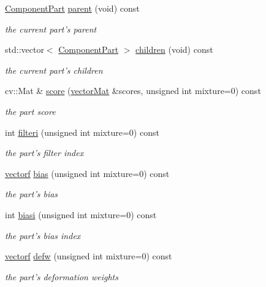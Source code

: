 \begin{DoxyCompactItemize}
\hyperlink{classComponentPart}{Component\-Part} \hyperlink{classComponentPart_a563956730a05cb34cc41278b6df1fa81}{parent} (void) const 
\begin{DoxyCompactList}\small\item\em the current part's parent \end{DoxyCompactList}\item 
std\-::vector$<$ \hyperlink{classComponentPart}{Component\-Part} $>$ \hyperlink{classComponentPart_acfa581b85329b7bf7eb4d10c2552db57}{children} (void) const 
\begin{DoxyCompactList}\small\item\em the current part's children \end{DoxyCompactList}\item 
cv\-::\-Mat \& \hyperlink{classComponentPart_a91d932065c3d5966282454c3ccde1171}{score} (\hyperlink{types_8hpp_a3207a7addcfa415d1c83622febcb1e9b}{vector\-Mat} \&scores, unsigned int mixture=0) const 
\begin{DoxyCompactList}\small\item\em the part score \end{DoxyCompactList}\item 
int \hyperlink{classComponentPart_a1a64f4ea97a74e67976c6132fa5b6709}{filteri} (unsigned int mixture=0) const 
\begin{DoxyCompactList}\small\item\em the part's filter index \end{DoxyCompactList}\item 
\hyperlink{types_8hpp_a4da5db3ee9e284f719ef5764dbadffc8}{vectorf} \hyperlink{classComponentPart_aceb613ee5301c45f64fbaec6790d6255}{bias} (unsigned int mixture=0) const 
\begin{DoxyCompactList}\small\item\em the part's bias \end{DoxyCompactList}\item 
int \hyperlink{classComponentPart_a60e06d1300f0f1254d779b1b559dddbb}{biasi} (unsigned int mixture=0) const 
\begin{DoxyCompactList}\small\item\em the part's bias index \end{DoxyCompactList}\item 
\hyperlink{types_8hpp_a4da5db3ee9e284f719ef5764dbadffc8}{vectorf} \hyperlink{classComponentPart_a6ef3b7d97b9218fee5e74ff7c9a25837}{defw} (unsigned int mixture=0) const 
\begin{DoxyCompactList}\small\item\em the part's deformation weights \end{DoxyCompactList}\item 

\end{DoxyCompactItemize}
